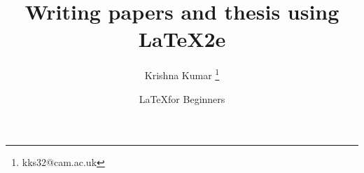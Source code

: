 \newenvironment{exampletwouptinyfifty}
  {\VerbatimEnvironment
   \begin{VerbatimOut}{example.out}}
  {\end{VerbatimOut}
   \setlength{\parindent}{0pt}
   \fbox{\begin{tabular}{l|l}
   \begin{minipage}{0.45\textwidth}
     \inputminted[fontsize=\scriptsize,resetmargins]{latex}{example.out}
   \end{minipage} &
   \begin{minipage}{0.45\textwidth}
     \setlength{\parskip}{6pt plus 1pt minus 1pt}%
     \raggedright\scriptsize
   \end{minipage}
   \end{tabular}}}

{
}


\usepackage{caption}
\captionsetup{font=scriptsize, labelfont=scriptsize, justification=centering}

\title{Writing papers and thesis using \LaTeX2e}

\author {Krishna Kumar \inst{*}\thanks{kks32@cam.ac.uk} }


\date[LaTeX course 2014] %
{\LaTeX for Beginners}





